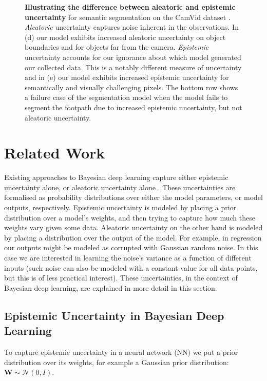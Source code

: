 \documentclass{article}
\newcommand{\N}{\mathcal{N}}
\newcommand{\W}{\mathbf{W}}
\begin{document}
\begin{figure*}[t]
{\begin{subfigure}[t]{0.22\linewidth}
\end{subfigure}}
\caption{\textbf{Illustrating the difference between aleatoric and epistemic uncertainty} for semantic segmentation on the CamVid dataset \citep{brostow2009semantic}. 
\textit{Aleatoric} uncertainty captures noise inherent in the observations. In (d) our model exhibits increased aleatoric uncertainty on object boundaries and for objects far from the camera.
\textit{Epistemic} uncertainty accounts for our ignorance about which model generated our collected data. This is a notably different measure of uncertainty and in (e) our model exhibits increased epistemic uncertainty for semantically and visually challenging pixels.
The bottom row shows a failure case of the segmentation model when the model fails to segment the footpath due to increased epistemic uncertainty, but not aleatoric uncertainty.}
\label{fig:camvid_qual}
\end{figure*}

\section{Related Work}
\label{related_work}

Existing approaches to Bayesian deep learning capture either epistemic uncertainty alone, or aleatoric uncertainty alone \cite{gal2016thesis}. These uncertainties are formalised as probability distributions over either the model parameters, or model outputs, respectively. Epistemic uncertainty is modeled by placing a prior distribution over a model's weights, and then trying to capture how much these weights vary given some data. Aleatoric uncertainty on the other hand is modeled by placing a distribution over the output of the model. For example, in regression our outputs might be modeled as corrupted with Gaussian random noise. In this case we are interested in learning the noise's variance as a function of different inputs (such noise can also be modeled with a constant value for all data points, but this is of less practical interest). These uncertainties, in the context of Bayesian deep learning, are explained in more detail in this section. 

\subsection{Epistemic Uncertainty in Bayesian Deep Learning}
\label{sect:dropout_VI}

To capture epistemic uncertainty in a neural network (NN) we put a prior distribution over its weights, for example a Gaussian prior distribution:
$\W \sim \N(0, I)$.
\end{document}
